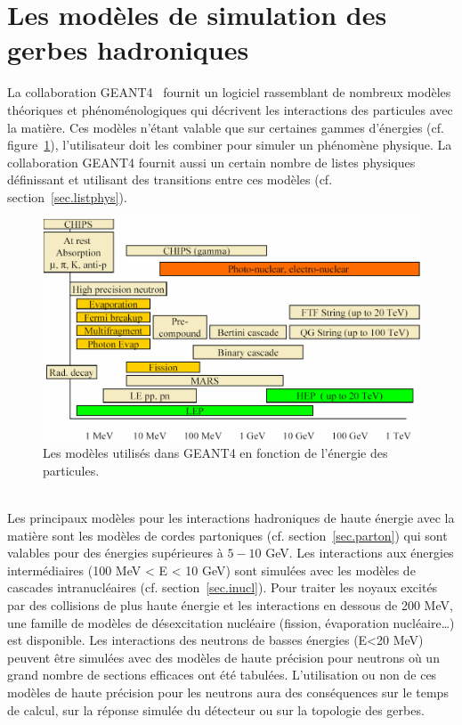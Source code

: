 \section{Les modèles de simulation des gerbes hadroniques}
La collaboration GEANT4~\cite{geant4} fournit un logiciel rassemblant de nombreux modèles théoriques et phénoménologiques qui décrivent les interactions des particules avec la matière. Ces modèles n'étant valable que sur certaines gammes d'énergies (cf. figure~\ref{fig.model}), l'utilisateur doit les combiner pour simuler un phénomène physique. La collaboration GEANT4 fournit aussi un certain nombre de listes physiques définissant et utilisant des transitions entre ces modèles (cf. section~\ref{sec.listphys}).
\begin{figure}[!ht]
  \begin{center}
    \includegraphics[width=.8\textwidth]{Digitizer/figs/HadronicModelsInventory.jpg}
    \caption{Les modèles utilisés dans GEANT4 en fonction de l'énergie des particules.}
    \label{fig.model}
  \end{center}
\end{figure}
\\
Les principaux modèles pour les interactions hadroniques de haute énergie avec la matière sont les modèles de cordes partoniques (cf. section~\ref{sec.parton}) qui sont valables pour des énergies supérieures à $5-10$ GeV. Les interactions aux énergies intermédiaires (100 MeV < E < 10 GeV) sont simulées avec les modèles de cascades intranucléaires (cf. section~\ref{sec.inucl}). Pour traiter les noyaux excités par des collisions de plus haute énergie et les interactions en dessous de 200 MeV, une famille de modèles de désexcitation nucléaire (fission, évaporation nucléaire\dots) est disponible. Les interactions des neutrons de basses énergies (E<20 MeV) peuvent être simulées avec des modèles de haute précision pour neutrons où un grand nombre de sections efficaces ont été tabulées. L'utilisation ou non de ces modèles de haute précision pour les neutrons aura des conséquences sur le temps de calcul, sur la réponse simulée du détecteur ou sur la topologie des gerbes.
